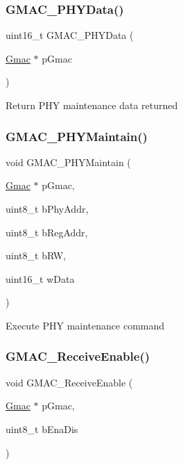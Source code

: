 \subsubsection{\texorpdfstring{GMAC\_PHYData()}{GMAC\_PHYData()}}
{\footnotesize\ttfamily uint16\+\_\+t G\+M\+A\+C\+\_\+\+P\+H\+Y\+Data (\begin{DoxyParamCaption}\item[{\mbox{\hyperlink{structGmac}{Gmac}} $\ast$}]{p\+Gmac }\end{DoxyParamCaption})}

Return P\+HY maintenance data returned \mbox{\label{group__gmac__defines_ga6f6f590403bb6a1e27b19715fae19d20}} 
\subsubsection{\texorpdfstring{GMAC\_PHYMaintain()}{GMAC\_PHYMaintain()}}
{\footnotesize\ttfamily void G\+M\+A\+C\+\_\+\+P\+H\+Y\+Maintain (\begin{DoxyParamCaption}\item[{\mbox{\hyperlink{structGmac}{Gmac}} $\ast$}]{p\+Gmac,  }\item[{uint8\+\_\+t}]{b\+Phy\+Addr,  }\item[{uint8\+\_\+t}]{b\+Reg\+Addr,  }\item[{uint8\+\_\+t}]{b\+RW,  }\item[{uint16\+\_\+t}]{w\+Data }\end{DoxyParamCaption})}

Execute P\+HY maintenance command \mbox{\label{group__gmac__defines_ga3caa9d3dc5ec1e3e32e9e017702ef51e}} 
\subsubsection{\texorpdfstring{GMAC\_ReceiveEnable()}{GMAC\_ReceiveEnable()}}
{\footnotesize\ttfamily void G\+M\+A\+C\+\_\+\+Receive\+Enable (\begin{DoxyParamCaption}\item[{\mbox{\hyperlink{structGmac}{Gmac}} $\ast$}]{p\+Gmac,  }\item[{uint8\+\_\+t}]{b\+Ena\+Dis }\end{DoxyParamCaption})}

